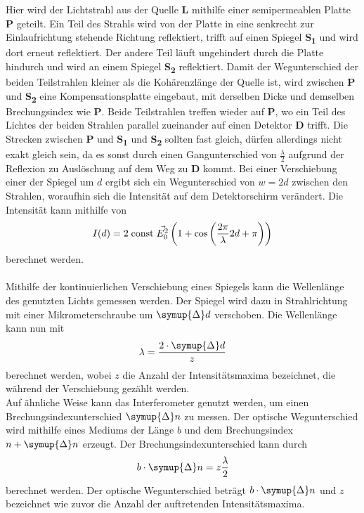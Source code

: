     Hier wird der Lichtstrahl aus der Quelle \textbf{L} mithilfe einer semipermeablen Platte \textbf{P} geteilt.
    Ein Teil des Strahls wird von der Platte in eine senkrecht zur Einlaufrichtung stehende Richtung reflektiert,
    trifft auf einen Spiegel \textbf{S\textsubscript{1}} und wird dort erneut reflektiert.
    Der andere Teil läuft ungehindert durch die Platte hindurch und wird an einem Spiegel \textbf{S\textsubscript{2}} reflektiert.
    Damit der Wegunterschied der beiden Teilstrahlen kleiner als die Kohärenzlänge der Quelle ist,
    wird zwischen \textbf{P} und \textbf{S\textsubscript{2}} eine Kompensationsplatte eingebaut,
    mit derselben Dicke und demselben Brechungsindex wie \textbf{P}.
    Beide Teilstrahlen treffen wieder auf \textbf{P},
    wo ein Teil des Lichtes der beiden Strahlen parallel zueinander auf einen Detektor \textbf{D} trifft.
    Die Strecken zwischen \textbf{P} und \textbf{S\textsubscript{1}} und \textbf{S\textsubscript{2}} sollten fast gleich,
    dürfen allerdings nicht exakt gleich sein,
    da es sonst durch einen Gangunterschied von $\frac{\lambda}{2}$ aufgrund der Reflexion zu Auslöschung auf dem Weg zu \textbf{D} kommt.
    Bei einer Verschiebung einer der Spiegel um $d$ ergibt sich ein Wegunterschied von $w = 2d$ zwischen den Strahlen,
    woraufhin sich die Intensität auf dem Detektorschirm verändert.
    Die Intensität kann mithilfe von
    \begin{equation*}
        I(d) = 2 \;\mathrm{const}\; \vec{E_0^2} \left( 1 + \cos\left( \frac{2\pi}{\lambda} 2d + \pi \right) \right)
    \end{equation*}
    berechnet werden.\\
    \\
    Mithilfe der kontinuierlichen Verschiebung eines Spiegels kann die Wellenlänge des genutzten Lichts gemessen werden.
    Der Spiegel wird dazu in Strahlrichtung mit einer Mikrometerschraube um $\symup{\Delta}d$ verschoben.
    Die Wellenlänge kann nun mit
    \begin{equation}
        \label{eqn:Wellenlänge}
        \lambda = \frac{2 \cdot \symup{\Delta}d}{z}
    \end{equation}
    berechnet werden,
    wobei $z$ die Anzahl der Intensitätsmaxima bezeichnet,
    die während der Verschiebung gezählt werden.\\
    Auf ähnliche Weise kann das Interferometer genutzt werden,
    um einen Brechungsindexunterschied $\symup{\Delta}n$ zu messen.
    Der optische Wegunterschied wird mithilfe eines Mediums der Länge $b$ und dem Brechungsindex $n + \symup{\Delta}n$ erzeugt.
    Der Brechungsindexunterschied kann durch
    \begin{equation}
        \label{eqn:brechungsindexunterschied}
        b \cdot \symup{\Delta}n = z \frac{\lambda}{2}
    \end{equation}
    berechnet werden.
    Der optische Wegunterschied beträgt $b \cdot \symup{\Delta}n$
    und $z$ bezeichnet wie zuvor die Anzahl der auftretenden Intensitätsmaxima.

